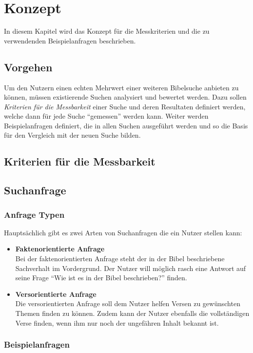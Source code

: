\chapter{Konzept}
In diesem Kapitel wird das Konzept für die Messkriterien und die zu verwendenden Beispielanfragen beschrieben.

\section{Vorgehen}
Um den Nutzern einen echten Mehrwert einer weiteren Bibelsuche anbieten zu können, müssen existierende Suchen analysiert und bewertet werden.
Dazu sollen \textit{Kriterien für die Messbarkeit} einer Suche und deren Resultaten definiert werden, welche dann für jede Suche "`gemessen"' werden kann.
Weiter werden Beispielanfragen definiert, die in allen Suchen ausgeführt werden und so die Basis für den Vergleich mit der neuen Suche bilden.

\section{Kriterien für die Messbarkeit}


\section{Suchanfrage }

\subsection{Anfrage Typen}
Hauptsächlich gibt es zwei Arten von Suchanfragen die ein Nutzer stellen kann:
\begin{itemize}
	\item \textbf{Faktenorientierte Anfrage}\\
		Bei der faktenorientierten Anfrage steht der in der Bibel beschriebene Sachverhalt im Vordergrund. Der Nutzer will möglich rasch eine Antwort auf seine Frage "`Wie ist es in der Bibel beschrieben?"' finden.

	\item \textbf{Versorientierte Anfrage}\\
		Die versorientierten Anfrage soll dem Nutzer helfen Versen zu gewünschten Themen finden zu können.
		Zudem kann der Nutzer ebenfalls die vollständigen Verse finden, wenn ihm nur noch der ungefähren Inhalt bekannt ist.
\end{itemize}


\subsection{Beispielanfragen}
